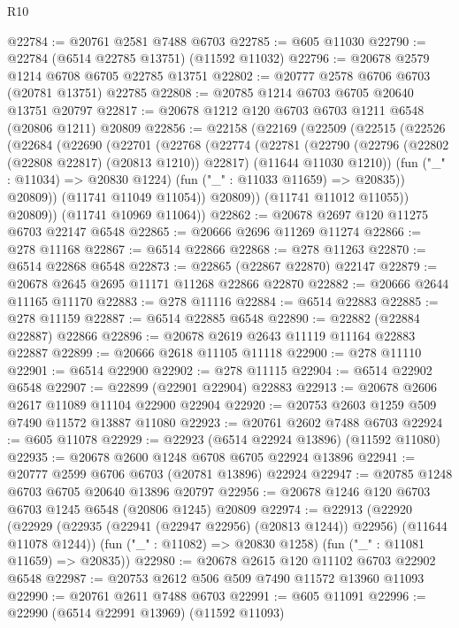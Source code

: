 \begin{lexlean}{R10}
\begin{coremodule}
{{{{{{{{{{{{{{{{{{{{{{{{{{{{{{{{{{{{{{{{{{{{{{{{{{{{{{{{{{{{{{{{{{{{{{{{{{{{{{{{{{{{@22784 := @20761 @2581 @7488 @6703
@22785 := @605 @11030
@22790 := @22784 (@6514 @22785 @13751) (@11592 @11032)
@22796 := @20678 @2579 @1214 @6708 @6705 @22785 @13751
@22802 := @20777 @2578 @6706 @6703 (@20781 @13751) @22785
@22808 := @20785 @1214 @6703 @6705 @20640 @13751 @20797
@22817 := @20678 @1212 @120 @6703 @6703 @1211 @6548 (@20806 @1211) @20809
@22856 := @22158
    (@22169
      (@22509
        (@22515
          (@22526
            (@22684
              (@22690
                (@22701
                  (@22768
                    (@22774
                      (@22781
                        (@22790
                          (@22796 (@22802 (@22808 @22817) (@20813 @1210)) @22817)
                          (@11644 @11030 @1210))
                        (fun ("_" : @11034) => @20830 @1224)
                        (fun ("_" : @11033 @11659) => @20835))
                      @20809))
                  (@11741 @11049 @11054))
                @20809))
            (@11741 @11012 @11055))
          @20809))
      (@11741 @10969 @11064))
@22862 := @20678 @2697 @120 @11275 @6703 @22147 @6548
@22865 := @20666 @2696 @11269 @11274
@22866 := @278 @11168
@22867 := @6514 @22866
@22868 := @278 @11263
@22870 := @6514 @22868 @6548
@22873 := @22865 (@22867 @22870) @22147
@22879 := @20678 @2645 @2695 @11171 @11268 @22866 @22870
@22882 := @20666 @2644 @11165 @11170
@22883 := @278 @11116
@22884 := @6514 @22883
@22885 := @278 @11159
@22887 := @6514 @22885 @6548
@22890 := @22882 (@22884 @22887) @22866
@22896 := @20678 @2619 @2643 @11119 @11164 @22883 @22887
@22899 := @20666 @2618 @11105 @11118
@22900 := @278 @11110
@22901 := @6514 @22900
@22902 := @278 @11115
@22904 := @6514 @22902 @6548
@22907 := @22899 (@22901 @22904) @22883
@22913 := @20678 @2606 @2617 @11089 @11104 @22900 @22904
@22920 := @20753 @2603 @1259 @509 @7490 @11572 @13887 @11080
@22923 := @20761 @2602 @7488 @6703
@22924 := @605 @11078
@22929 := @22923 (@6514 @22924 @13896) (@11592 @11080)
@22935 := @20678 @2600 @1248 @6708 @6705 @22924 @13896
@22941 := @20777 @2599 @6706 @6703 (@20781 @13896) @22924
@22947 := @20785 @1248 @6703 @6705 @20640 @13896 @20797
@22956 := @20678 @1246 @120 @6703 @6703 @1245 @6548 (@20806 @1245) @20809
@22974 := @22913
    (@22920
      (@22929 (@22935 (@22941 (@22947 @22956) (@20813 @1244)) @22956) (@11644 @11078 @1244))
      (fun ("_" : @11082) => @20830 @1258)
      (fun ("_" : @11081 @11659) => @20835))
@22980 := @20678 @2615 @120 @11102 @6703 @22902 @6548
@22987 := @20753 @2612 @506 @509 @7490 @11572 @13960 @11093
@22990 := @20761 @2611 @7488 @6703
@22991 := @605 @11091
@22996 := @22990 (@6514 @22991 @13969) (@11592 @11093)
}}}}}}}}}}}}}}}}}}}}}}}}}}}}}}}}}}}}}}}}}}}}}}}}}}}}}}}}}}}}}}}}}}}}}}}}}}}}}}}}}}}}
\end{coremodule}
\end{lexlean}
